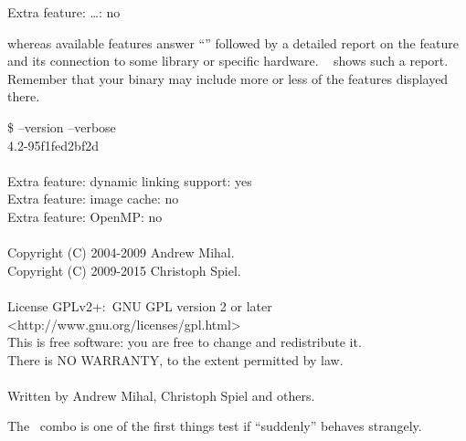 \begin{literal}
  Extra feature: \dots: no
\end{literal}

whereas available features answer ``'' followed by a detailed report on the feature
and its connection to some library or specific hardware.
\exampleName~ shows such a report.  Remember that your binary
may include more or less of the features displayed there.

\begin{exemplar}
  \begin{maxipage}
    \begin{terminal}
      \$ \app{} --version --verbose \\
        \app{} 4.2-95f1fed2bf2d \\
        ~ \\
        Extra feature: dynamic linking support: yes \\
        Extra feature: image cache: no \\
        Extra feature: OpenMP: no \\
        ~ \\
        Copyright (C) 2004-2009 Andrew Mihal. \\
        Copyright (C) 2009-2015 Christoph Spiel. \\
        ~ \\
        License GPLv2+:~GNU GPL version 2 or later <http://www.gnu.org/licenses/gpl.html> \\
        This is free software: you are free to change and redistribute it. \\
        There is NO WARRANTY, to the extent permitted by law. \\
        ~ \\
        Written by Andrew Mihal, Christoph Spiel and others.
    \end{terminal}
  \end{maxipage}

  \caption[Output of ]%
          {\label{ex:option-version-verbose}%
            Example output of \appcmd{} when called with options 
            and~ together.}
\end{exemplar}

The ~combo is one of the first things test if \appcmd{} ``suddenly''
behaves strangely.

